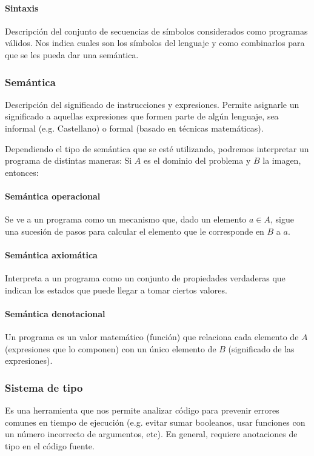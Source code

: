 \paragraph{Sintaxis} Descripción del conjunto de secuencias de símbolos considerados como programas válidos. Nos indica cuales son los símbolos del lenguaje y como combinarlos para que se les pueda dar una semántica.

\subsubsection{Semántica}

Descripción del significado de instrucciones y expresiones. Permite asignarle un significado a aquellas expresiones que formen parte de algún lenguaje, sea informal (e.g. Castellano) o formal (basado en técnicas matemáticas).

Dependiendo el tipo de semántica que se esté utilizando, podremos interpretar un programa de distintas maneras:  Si $A$ es el dominio del problema y $B$ la imagen, entonces:

\paragraph{Semántica operacional} Se ve a un programa como un mecanismo que, dado un elemento $a\in A $, sigue una sucesión de pasos para calcular el elemento que le corresponde en $B$ a $a$.

\paragraph{Semántica axiomática} Interpreta a un programa como un conjunto de propiedades verdaderas que indican los estados que puede llegar a tomar ciertos valores.

\paragraph{Semántica denotacional} Un programa es un valor matemático (función) que relaciona cada elemento de $A$ (expresiones que lo componen) con un único elemento de $B$ (significado de las expresiones).

\subsubsection{Sistema de tipo}
Es una herramienta que nos permite analizar código para prevenir errores comunes en tiempo de ejecución (e.g. evitar sumar booleanos, usar funciones con un número incorrecto de argumentos, etc). En general, requiere anotaciones de tipo en el código fuente. 

